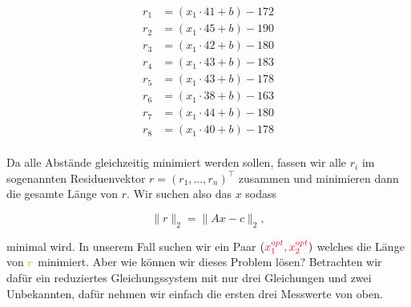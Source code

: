 \begin{figure*}[h]
\begin{minipage}
    \end{minipage}    
    \hfill
    \begin{minipage}
        {0.29\textwidth}
        \centering
        \begin{equation*}
            \begin{aligned}
                r_1 &= (x_1\cdot 41 + b) - 172 \\
                r_2 &= (x_1\cdot 45 + b) - 190 \\
                r_3 &= (x_1\cdot 42 + b) - 180 \\
                r_4 &= (x_1\cdot 43 + b) - 183 \\
                r_5 &= (x_1\cdot 43 + b) - 178 \\
                r_6 &= (x_1\cdot 38 + b) - 163 \\
                r_7 &= (x_1\cdot 44 + b) - 180 \\
                r_8 &= (x_1\cdot 40 + b) - 178 \\
            \end{aligned}
        \end{equation*}
    \end{minipage}
\end{figure*}

Da alle Abstände gleichzeitig minimiert werden sollen, fassen wir alle \( r_i \) im sogenannten Residuenvektor \( r = (r_1, \dots, r_n)^\top \) zusammen und minimieren dann die gesamte Länge von \( r \). Wir suchen also das \( x \) sodass

\begin{equation*}
    \lVert r \rVert_2 = \lVert A x - c \rVert_2,
\end{equation*}

minimal wird. In unserem Fall suchen wir ein Paar \( (\textcolor{customred}{x_1^{opt}, x_2^{opt}}) \)  welches die Länge von \( \textcolor{customorange}{r} \) minimiert. Aber wie können wir dieses Problem lösen? Betrachten wir dafür ein reduziertes Gleichungssystem mit nur drei Gleichungen und zwei Unbekannten, dafür nehmen wir einfach die ersten drei Messwerte von oben. 


